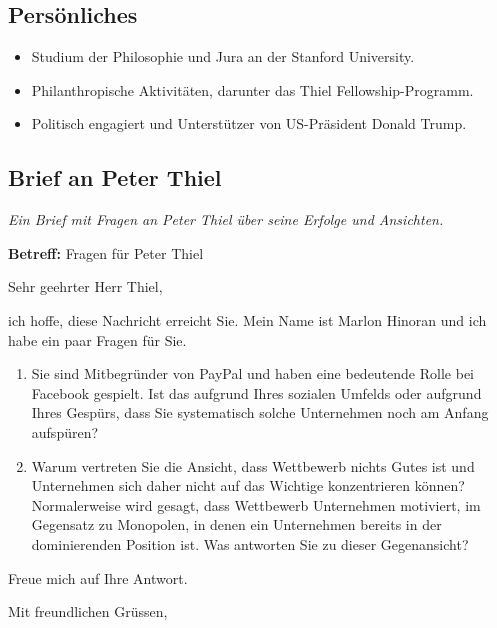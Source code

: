 \documentclass[10pt]{article}
\begin{document}
\subsection*{Persönliches}
\begin{itemize}
\item Studium der Philosophie und Jura an der Stanford University.
\item Philanthropische Aktivitäten, darunter das Thiel Fellowship-Programm.
\item Politisch engagiert und Unterstützer von US-Präsident Donald Trump.
\end{itemize}

\clearpage


\begin{center}
\section*{Brief an Peter Thiel}
\textit{Ein Brief mit Fragen an Peter Thiel über seine Erfolge und Ansichten.}
\end{center}

\textbf{Betreff:} Fragen für Peter Thiel

\vspace{10pt}

Sehr geehrter Herr Thiel,

ich hoffe, diese Nachricht erreicht Sie. Mein Name ist Marlon Hinoran und ich habe ein paar Fragen für Sie.

\begin{enumerate}
\item Sie sind Mitbegründer von PayPal und haben eine bedeutende Rolle bei Facebook gespielt. Ist das aufgrund Ihres sozialen Umfelds oder aufgrund Ihres Gespürs, dass Sie systematisch solche Unternehmen noch am Anfang aufspüren?
\item Warum vertreten Sie die Ansicht, dass Wettbewerb nichts Gutes ist und Unternehmen sich daher nicht auf das Wichtige konzentrieren können? Normalerweise wird gesagt, dass Wettbewerb Unternehmen motiviert, im Gegensatz zu Monopolen, in denen ein Unternehmen bereits in der dominierenden Position ist. Was antworten Sie zu dieser Gegenansicht?
\end{enumerate}

Freue mich auf Ihre Antwort.

Mit freundlichen Grüssen,
\end{document}
